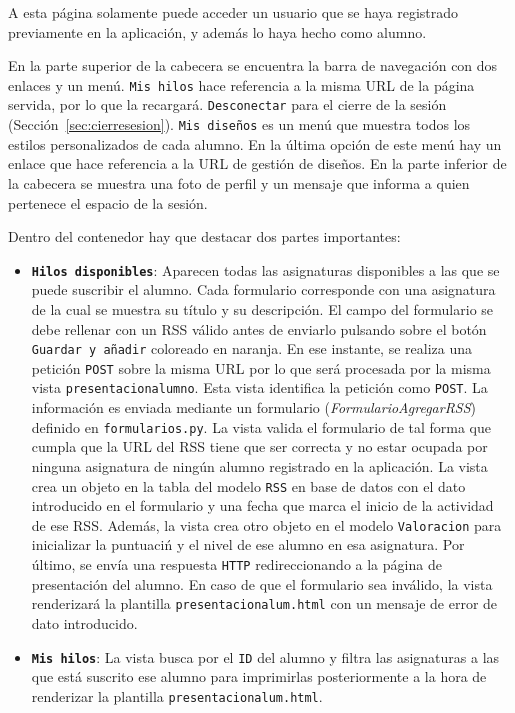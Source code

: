 \documentclass[a4paper, 12pt]{book}
\begin{document}
A esta p\'agina solamente puede acceder un usuario que se haya registrado previamente en la aplicaci\'on, y adem\'as lo haya hecho como alumno.

En la parte superior de la cabecera se encuentra la barra de navegaci\'on con dos enlaces y un men\'u. \texttt{Mis hilos} hace referencia a la misma URL de la 
p\'agina servida, por lo que la recargar\'a. \texttt{Desconectar} para el cierre de la sesi\'on (Secci\'on~\ref{sec:cierresesion}). \texttt{Mis dise\~nos} es un men\'u 
que muestra todos los estilos personalizados de cada alumno. En la \'ultima opci\'on de este men\'u hay un enlace que hace referencia a la URL de gesti\'on de dise\~nos. 
En la parte inferior de la cabecera se muestra una foto de perfil y un mensaje que informa a quien pertenece 
el espacio de la sesi\'on.

Dentro del contenedor hay que destacar dos partes importantes:
\begin{itemize}
  \item {\bfseries \texttt{Hilos disponibles}}: Aparecen todas las asignaturas disponibles a las que se puede suscribir el alumno. Cada formulario 
  corresponde con una asignatura de la cual se muestra su t\'itulo y su descripci\'on. El campo del formulario se debe rellenar con un RSS v\'alido antes 
  de enviarlo pulsando sobre el bot\'on \texttt{Guardar y a\~nadir} coloreado en naranja. En ese instante, se realiza una petici\'on 
  \texttt{POST} sobre la misma URL por lo que ser\'a procesada por la misma vista \texttt{presentacionalumno}. Esta vista identifica la petici\'on como 
  \texttt{POST}. La informaci\'on es enviada mediante un formulario (\textit{FormularioAgregarRSS}) definido en \texttt{formularios.py}. La vista valida 
  el formulario de tal forma que cumpla que la URL del RSS tiene que ser correcta y no estar ocupada por ninguna asignatura de ning\'un alumno registrado 
  en la aplicaci\'on. La vista crea un objeto en la tabla del modelo \texttt{RSS} en base de datos con el dato introducido en el formulario y una fecha que 
  marca el inicio de la actividad de ese RSS. Adem\'as, la vista crea otro objeto en el modelo \texttt{Valoracion} para inicializar la puntuaci\'n y el 
  nivel de ese alumno en esa asignatura. Por \'ultimo, se env\'ia una respuesta \texttt{HTTP} redireccionando a la p\'agina de presentaci\'on del alumno. 
  En caso de que el formulario sea inv\'alido, la vista renderizar\'a la plantilla \texttt{presentacionalum.html} con un mensaje de error de dato 
  introducido.
  \item {\bfseries \texttt{Mis hilos}}: La vista busca por el \texttt{ID} del alumno y filtra las asignaturas a las que est\'a suscrito ese alumno para 
  imprimirlas posteriormente a la hora de renderizar la plantilla \texttt{presentacionalum.html}.
\end{itemize}
\end{document}
